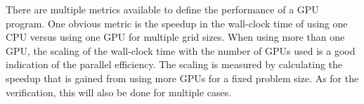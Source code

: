 There are multiple metrics available to define the performance of a GPU program. One obvious metric is the speedup in the wall-clock time of using one CPU versus using one GPU for multiple grid sizes. When using more than one GPU, the scaling of the wall-clock time with the number of GPUs used is a good indication of the parallel efficiency. The scaling is measured by calculating the speedup that is gained from using more GPUs for a fixed problem size. As for the verification, this will also be done for multiple cases.